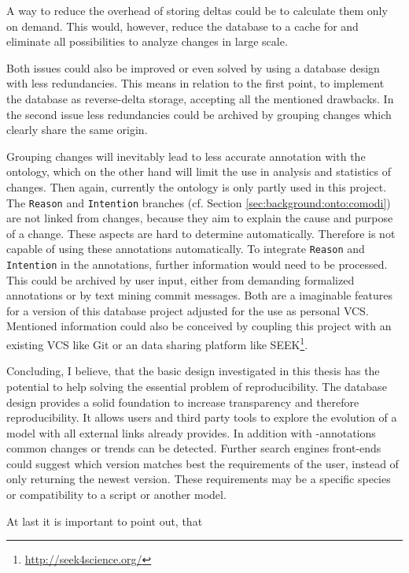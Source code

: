 A way to reduce the overhead of storing deltas could be to calculate them only on demand. This would, however, reduce the database to a cache for \bives and eliminate all possibilities to analyze changes in large scale.

Both issues could also be improved or even solved by using a database design with less redundancies. This means in relation to the first point, to implement the database as reverse-delta storage, accepting all the mentioned drawbacks.
In the second issue less redundancies could be archived by grouping changes which clearly share the same origin.

Grouping changes will inevitably lead to less accurate annotation with the \comodi ontology, which on the other hand will limit the use in analysis and statistics of changes. 
Then again, currently the \comodi ontology is only partly used in this project. The \texttt{Reason} and \texttt{Intention} branches (cf. Section \ref{sec:background:onto:comodi}) are not linked from changes, because they aim to explain the cause and purpose of a change. These aspects are hard to determine automatically. Therefore \bives is not capable of using these annotations automatically.
To integrate \texttt{Reason} and \texttt{Intention} in the annotations, further information would need to be processed. This could be archived by user input, either from demanding formalized annotations or by text mining commit messages. 
Both are a imaginable features for a version of this database project adjusted for the use as personal VCS.
Mentioned information could also be conceived by coupling this project with an existing VCS like Git or an data sharing platform like SEEK\footnote{\url{http://seek4science.org/}}.

Concluding, I believe, that the basic design investigated in this thesis has the potential to help solving the essential problem of reproducibility. The database design provides a solid foundation to increase transparency and therefore reproducibility. It allows users and third party tools to explore the evolution of a model with all external links \masymos already provides. In addition with \comodi-annotations common changes or trends can be detected.
Further search engines front-ends could suggest which version matches best the requirements of the user, instead of only returning the newest version. These requirements may be a specific species or compatibility to a \sedml script or another model.

At last it is important to point out, that 

